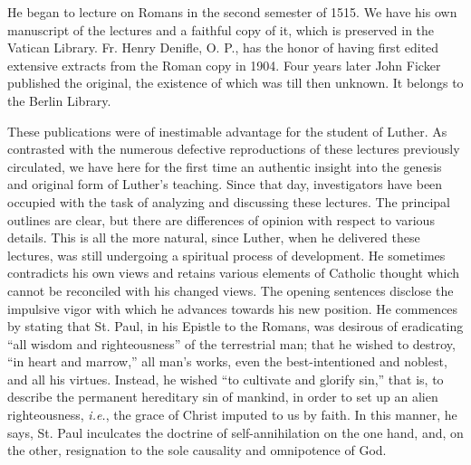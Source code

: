 He began to lecture on Romans in the second semester of 1515.
We have his own manuscript of the lectures and a faithful copy
of it, which is preserved in the Vatican Library. Fr. Henry Denifle,
O. P., has the honor of having first edited extensive extracts from
the Roman copy in 1904. Four years later John Ficker published the
original, the existence of which was till then unknown. It belongs
to the Berlin Library.

These publications were of inestimable advantage for the student
of Luther. As contrasted with the numerous defective reproductions
of these lectures previously circulated, we have here for the first time
an authentic insight into the genesis and original form of Luther’s
teaching. Since that day, investigators have been occupied with the
task of analyzing and discussing these lectures. The principal outlines
are clear, but there are differences of opinion with respect to
various details. This is all the more natural, since Luther, when he
delivered these lectures, was still undergoing a spiritual process of
development. He sometimes contradicts his own views and retains
various elements of Catholic thought which cannot be reconciled
with his changed views. The opening sentences disclose the impulsive
vigor with which he advances towards his new position. He commences by
stating that St. Paul, in his Epistle to the Romans, was
desirous of eradicating “all wisdom and righteousness” of the terrestrial man;
that he wished to destroy, “in heart and marrow,” all
man’s works, even the best-intentioned and noblest, and all his
virtues. Instead, he wished “to cultivate and glorify sin,” that is,
to describe the permanent hereditary sin of mankind, in order to set
up an alien righteousness, \textit{i.e.}, the grace of Christ imputed to us by
faith. In this manner, he says, St. Paul inculcates the doctrine of self-annihilation
on the one hand, and, on the other, resignation to the
sole causality and omnipotence of God.
